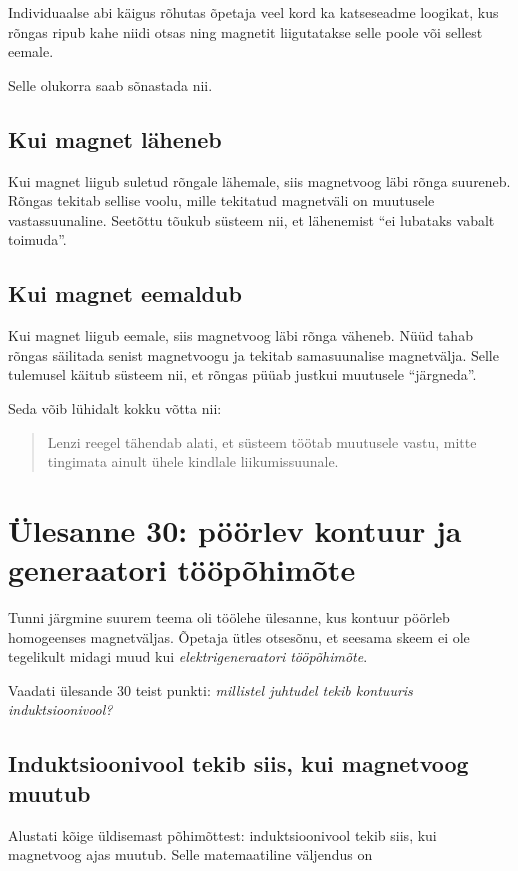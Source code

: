 \documentclass[a4paper,11pt]{article}
\begin{document}
Individuaalse abi käigus rõhutas õpetaja veel kord ka katseseadme loogikat, kus rõngas ripub kahe niidi otsas ning magnetit liigutatakse selle poole või sellest eemale.

Selle olukorra saab sõnastada nii.

\subsection{Kui magnet läheneb}

Kui magnet liigub suletud rõngale lähemale, siis magnetvoog läbi rõnga suureneb. Rõngas tekitab sellise voolu, mille tekitatud magnetväli on muutusele vastassuunaline. Seetõttu tõukub süsteem nii, et lähenemist ``ei lubataks vabalt toimuda''.

\subsection{Kui magnet eemaldub}

Kui magnet liigub eemale, siis magnetvoog läbi rõnga väheneb. Nüüd tahab rõngas säilitada senist magnetvoogu ja tekitab samasuunalise magnetvälja. Selle tulemusel käitub süsteem nii, et rõngas püüab justkui muutusele ``järgneda''.

Seda võib lühidalt kokku võtta nii:

\begin{quote}
Lenzi reegel tähendab alati, et süsteem töötab muutusele vastu, mitte tingimata ainult ühele kindlale liikumissuunale.
\end{quote}

\section{Ülesanne 30: pöörlev kontuur ja generaatori tööpõhimõte}

Tunni järgmine suurem teema oli töölehe ülesanne, kus kontuur pöörleb homogeenses magnetväljas. Õpetaja ütles otsesõnu, et seesama skeem ei ole tegelikult midagi muud kui \emph{elektrigeneraatori tööpõhimõte}.

Vaadati ülesande 30 teist punkti: \emph{millistel juhtudel tekib kontuuris induktsioonivool?}

\subsection{Induktsioonivool tekib siis, kui magnetvoog muutub}

Alustati kõige üldisemast põhimõttest: induktsioonivool tekib siis, kui magnetvoog ajas muutub. Selle matemaatiline väljendus on
\end{document}
